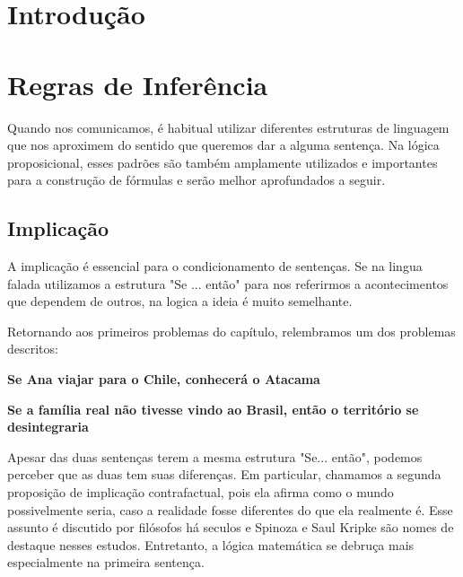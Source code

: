 \section{Introdução}

\section{Regras de Inferência}
Quando nos comunicamos, é habitual utilizar diferentes estruturas de linguagem que nos aproximem do sentido que queremos dar a alguma sentença. Na lógica proposicional, esses padrões são também amplamente utilizados e importantes para a construção de fórmulas e serão melhor aprofundados a seguir.

\subsection{Implicação} 
A implicação é essencial para o condicionamento de sentenças. Se na lingua falada utilizamos a estrutura "Se ... então" para nos referirmos a acontecimentos que dependem de outros, na logica a ideia é muito semelhante.

Retornando aos primeiros problemas do capítulo, relembramos um dos problemas descritos:
\begin{center}
\textbf{Se Ana viajar para o Chile, conhecerá o Atacama}

\textbf{Se a família real não tivesse vindo ao Brasil, então o território se desintegraria}
\end{center}

Apesar das duas sentenças terem a mesma estrutura "Se... então", podemos perceber que as duas tem suas diferenças. Em particular, chamamos a segunda proposição de implicação contrafactual, pois ela afirma como o mundo possivelmente seria, caso a realidade fosse diferentes do que ela realmente é. Esse assunto é discutido por filósofos há seculos e Spinoza e Saul Kripke são nomes de destaque nesses estudos. Entretanto, a lógica matemática se debruça mais especialmente na primeira sentença.

